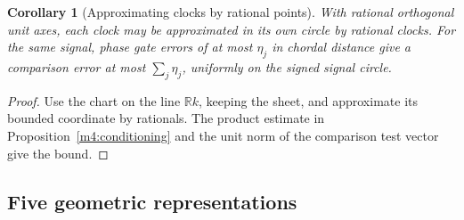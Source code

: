\documentclass[11pt,reqno]{amsart}
\newtheorem{corollary}[theorem]{Corollary}
\theoremstyle{definition}
\theoremstyle{remark}
\numberwithin{equation}{section}
\newcommand{\R}{\mathbb{R}}
\begin{document}
\begin{corollary}[Approximating clocks by rational points]\label{m4:approxphase}
With rational orthogonal unit axes, each clock may be approximated in its own circle by rational clocks. For the same signal, phase gate errors of at most $\eta_j$ in chordal distance give a comparison error at most $\sum_j\eta_j$, uniformly on the signed signal circle.
\end{corollary}
\begin{proof}
Use the chart on the line $\R k$, keeping the sheet, and approximate its bounded coordinate by rationals. The product estimate in Proposition~\ref{m4:conditioning} and the unit norm of the comparison test vector give the bound.
\end{proof}

\subsection{Five geometric representations}
\end{document}
